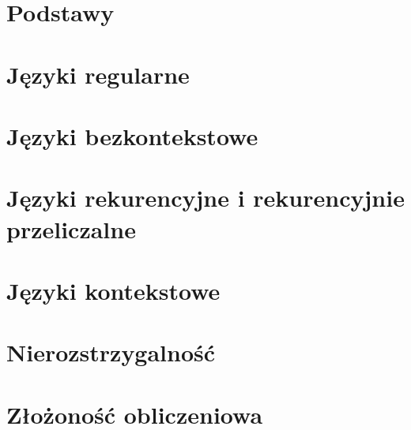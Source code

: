 \documentclass[12pt, a4paper, polish, openany]{book}
\begin{document}
\frontmatter



\tableofcontents


\mainmatter

\chapter*{Podstawy}


\chapter{Języki regularne}


\chapter{Języki bezkontekstowe}


\chapter{Języki rekurencyjne i rekurencyjnie przeliczalne}


\chapter{Języki kontekstowe}


\chapter{Nierozstrzygalność}


\chapter{Złożoność obliczeniowa}

\end{document}
